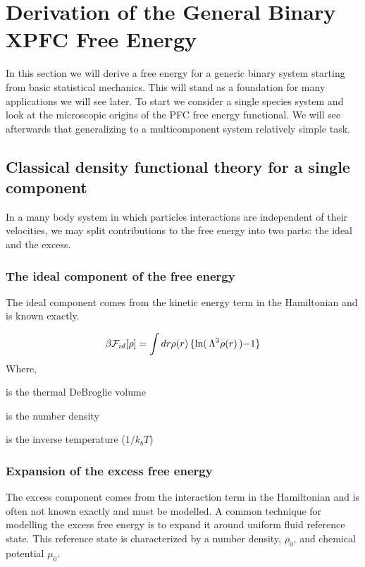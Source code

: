 \section{Derivation of the General Binary XPFC Free Energy}

In this section we will derive a free energy for a generic binary system starting from basic statistical mechanics.
This will stand as a foundation for many applications we will see later.
To start we consider a single species system and look at the microscopic origins of the PFC free energy functional.
We will see afterwards that generalizing to a multicomponent system relatively simple task.

\subsection{Classical density functional theory for a single component}

In a many body system in which particles interactions are independent of their velocities, we may split contributions to the free energy into two parts: the ideal and the excess.

\subsubsection{The ideal component of the free energy}
The ideal component comes from the kinetic energy term in the Hamiltonian and is known exactly.

\begin{equation}
    \beta\mathcal{F}_{id}[\rho] = \int dr \rho(r) \left\lbrace\ln\right(\Lambda^3\rho(r)\left) - 1\right\rbrace
\end{equation}
Where,
\begin{description}[labelindent=10pt, labelsep=10pt]
\item[$\Lambda^3$] is the thermal DeBroglie volume
\item[$\rho(r)$] is the number density
\item[$\beta$] is the inverse temperature ($1/k_bT$)
\end{description}

\subsubsection{Expansion of the excess free energy}
The excess component comes from the interaction term in the Hamiltonian and is often not known exactly and must be modelled.
A common technique for modelling the excess free energy is to expand it around uniform fluid reference state.
This reference state is characterized by a number density, $\rho_0$, and chemical potential $\mu_0$.

